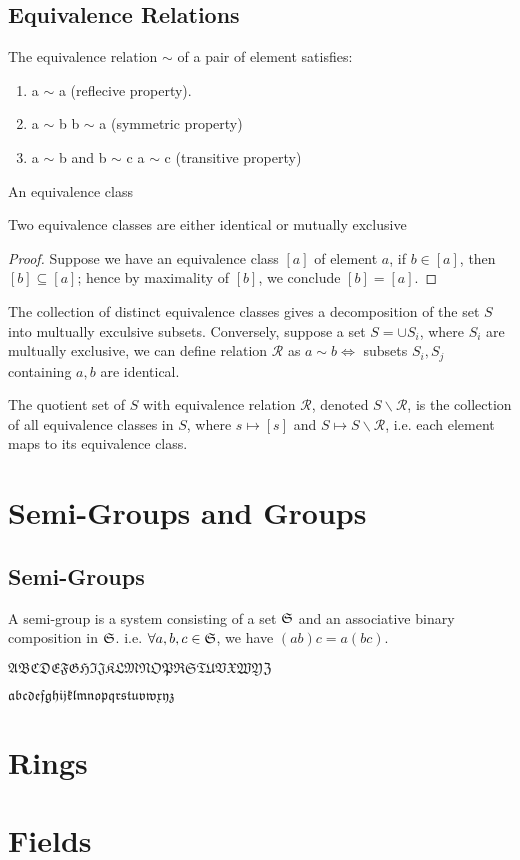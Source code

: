 	\subsection{Equivalence Relations}
		\begin{definition}
		The equivalence relation $\sim$ of a pair of element satisfies:
		\begin{enumerate}
		\item a $\sim$ a (reflecive property).
		\item a $\sim$ b \implies b $\sim$ a (symmetric property)
		\item a $\sim$ b and b $\sim$ c \implies a $\sim$ c (transitive property)
 		\end{enumerate}
		\end{definition}
		\begin{definition}
		An equivalence class 
		\end{definition}
		\begin{theorem}
		Two equivalence classes are either identical or mutually exclusive
		\end{theorem}
		\begin{proof}
		Suppose we have an equivalence class $[a]$ of element $a$, if $b\in [a]$, then $[b]\subseteq[a]$; hence by maximality of $[b]$, we conclude $[b]=[a]$.
		\end{proof}
		\begin{corollary}
		The collection of distinct equivalence classes gives a decomposition of the set $S$ into multually exculsive subsets. Conversely, suppose a set $S=\cup S_i$, where $S_i$ are multually exclusive, we can define relation $\mathcal{R}$ as $a\sim b \iff $ subsets $S_i,S_j$ containing $a,b$ are identical.
		\end{corollary}
		\begin{definition}
		The quotient set of $S$ with equivalence relation $\mathcal{R}$, denoted $S\backslash\mathcal{R}$, is the collection of all equivalence classes in $S$, where $s\mapsto[s]$ and $S\mapsto S\backslash\mathcal{R}$, i.e. each element maps to its equivalence class.
		\end{definition}
	\section{Semi-Groups and Groups}
	\subsection{Semi-Groups}
	\begin{definition}
	A semi-group is a system consisting of a set $\mathfrak{S}$ and an associative binary composition in $\mathfrak{S}$. i.e. $\forall a,b,c \in \mathfrak{S}$, we have $(ab)c=a(bc)$.
	\end{definition}
	
	$\mathfrak{ABCDEFGHIJKLMNOPRSTUVXWYZ}$
	
	$\mathfrak{abcdefghijklmnopqrstuvwxyz}$
	\section{Rings}
	\section{Fields}
	
